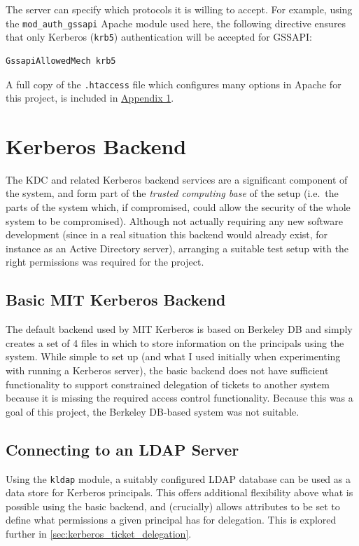 \documentclass{report}
\begin{document}
The server can specify which protocols it is willing to accept. For example, using the \verb+mod_auth_gssapi+ Apache module used here, the following directive ensures that only Kerberos (\texttt{krb5}) authentication will be accepted for GSSAPI:

\begin{verbatim}
GssapiAllowedMech krb5
\end{verbatim}

A full copy of the \verb+.htaccess+ file which configures many options in Apache for this project, is included in \hyperref[sec:appendix1]{Appendix 1}.

\section{Kerberos Backend}
The KDC and related Kerberos backend services are a significant component of the system, and form part of the \textit{trusted computing base} of the setup (i.e.\ the parts of the system which, if compromised, could allow the security of the whole system to be compromised). Although not actually requiring any new software development (since in a real situation this backend would already exist, for instance as an Active Directory server), arranging a suitable test setup with the right permissions was required for the project.

\subsection{Basic MIT Kerberos Backend}
The default backend used by MIT Kerberos is based on Berkeley DB and simply creates a set of 4 files in which to store information on the principals using the system\cite{KDC-database-docs}. While simple to set up (and what I used initially when experimenting with running a Kerberos server), the basic backend does not have sufficient functionality to support constrained delegation of tickets to another system because it is missing the required access control functionality\cite{KRB-DELEG}. Because this was a goal of this project, the Berkeley DB-based system was not suitable.

\subsection{Connecting to an LDAP Server}
Using the \texttt{kldap} module, a suitably configured LDAP database can be used as a data store for Kerberos principals. This offers additional flexibility above what is possible using the basic backend, and (crucially) allows attributes to be set to define what permissions a given principal has for delegation. This is explored further in \autoref{sec:kerberos_ticket_delegation}.
\end{document}

